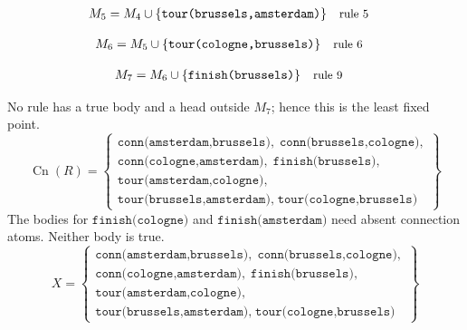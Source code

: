 \documentclass[a4paper,11pt]{article}
\newif\ifexplain
\newcommand{\explain}[1]{\ifexplain\begin{erklbox}#1\end{erklbox}\fi}
\newcommand{\why}[1]{\text{\small #1}}
\newcommand{\at}[1]{\texttt{#1}}
\begin{document}
\begin{align*}
M_{5} &= M_{4}\cup \{\at{tour(brussels,amsterdam)}\} && \why{rule 5}
\end{align*}
\explain{Für $\at{tour(brussels,amsterdam)}$ brauchen wir $\at{conn(brussels,cologne)}$ und $\at{conn(cologne,amsterdam)}$. Weil diese Voraussetzungen bereits hergeleitet sind, dürfen wir den Regelkopf jetzt aufnehmen und alle bisherigen Atome behalten; bei einer fehlenden Voraussetzung würde diese Regel dagegen noch nichts beitragen.}
\begin{align*}
M_{6} &= M_{5}\cup \{\at{tour(cologne,brussels)}\} && \why{rule 6}
\end{align*}
\explain{Für $\at{tour(cologne,brussels)}$ brauchen wir $\at{conn(amsterdam,brussels)}$ und $\at{conn(cologne,amsterdam)}$. Weil diese Voraussetzungen bereits hergeleitet sind, dürfen wir den Regelkopf jetzt aufnehmen und alle bisherigen Atome behalten; bei einer fehlenden Voraussetzung würde diese Regel dagegen noch nichts beitragen.}
\begin{align*}
M_{7} &= M_{6}\cup \{\at{finish(brussels)}\} && \why{rule 9}
\end{align*}
\explain{Für $\at{finish(brussels)}$ brauchen wir $\at{conn(cologne,amsterdam)}$ und $\at{tour(cologne,brussels)}$. Weil diese Voraussetzungen bereits hergeleitet sind, dürfen wir den Regelkopf jetzt aufnehmen und alle bisherigen Atome behalten; bei einer fehlenden Voraussetzung würde diese Regel dagegen noch nichts beitragen.}
No rule has a true body and a head outside $M_{7}$; hence this is the least fixed point.
\[
\operatorname{Cn}(R)=\left\{\begin{gathered}\at{conn(amsterdam,brussels)},\;\at{conn(brussels,cologne)},\\\at{conn(cologne,amsterdam)},\;\at{finish(brussels)},\\\at{tour(amsterdam,cologne)},\\\at{tour(brussels,amsterdam)},\;\at{tour(cologne,brussels)}\end{gathered}\right\}
\]
The bodies for $\at{finish(cologne)}$ and $\at{finish(amsterdam)}$ need absent connection atoms. Neither body is true.
\[
\boxed{X=\left\{\begin{gathered}\at{conn(amsterdam,brussels)},\;\at{conn(brussels,cologne)},\\\at{conn(cologne,amsterdam)},\;\at{finish(brussels)},\\\at{tour(amsterdam,cologne)},\\\at{tour(brussels,amsterdam)},\;\at{tour(cologne,brussels)}\end{gathered}\right\}}
\]
\end{document}
